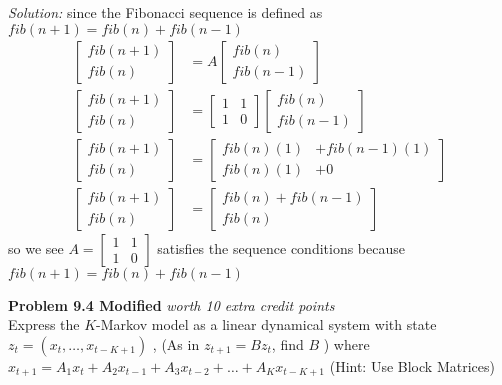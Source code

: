 \documentclass{article}
\newenvironment{problem}[3][Problem]
    { \begin{mdframed}[backgroundcolor=gray!20] \textbf{#1 #2} \textit{worth #3 points} \\}
    {  \end{mdframed}}
\newenvironment{solution}
    {\textit{Solution:}}
    {}
\begin{document}
\begin{solution}
    since the Fibonacci sequence is defined as $fib(n+1) = fib(n) + fib(n-1)$
\begin{align*}
    \begin{bmatrix} fib(n+1) \\ fib(n) \end{bmatrix} &= A \begin{bmatrix} fib(n) \\ fib(n-1) \end{bmatrix} \\
    \begin{bmatrix} fib(n+1) \\ fib(n) \end{bmatrix} &= \begin{bmatrix} 1 & 1 \\ 1 & 0 \end{bmatrix} \begin{bmatrix} fib(n) \\ fib(n-1) \end{bmatrix}\\
    \begin{bmatrix} fib(n+1) \\ fib(n) \end{bmatrix} &= \begin{bmatrix} fib(n)(1) &+ fib(n-1)(1) \\ fib(n)(1) &+ 0 \end{bmatrix}\\
    \begin{bmatrix} fib(n+1) \\ fib(n) \end{bmatrix} &= \begin{bmatrix} fib(n) + fib(n-1) \\ fib(n) \end{bmatrix}
\end{align*}
so we see $A = \begin{bmatrix} 1 & 1 \\ 1 & 0 \end{bmatrix}$ satisfies the sequence conditions because $fib(n+1) = fib(n) + fib(n-1)$
\end{solution}
\begin{problem}{9.4 Modified}{10 extra credit}
Express the $K$-Markov model as a linear dynamical system with state $z_t = (x_t, \ldots, x_{t - K + 1})$ , (As in $z_{t + 1} = Bz_t$, find $B$ ) where $x_{t+1}=A_{1} x_{t}+A_{2} x_{t-1}+A_{3} x_{t-2}+\ldots+A_{K} x_{t-K+1}$  (Hint: Use Block Matrices)
\end{problem}
\end{document}
